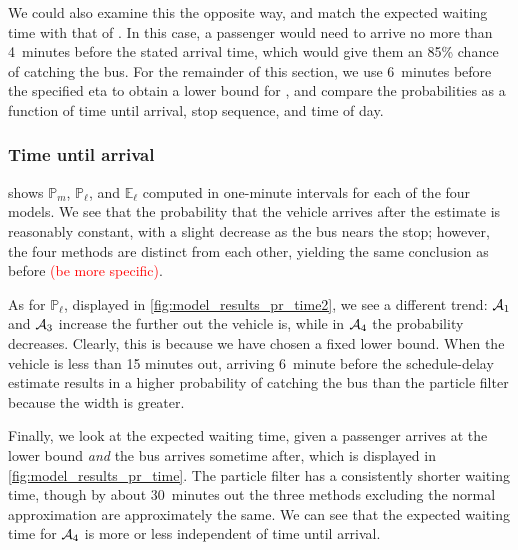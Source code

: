 We could also examine this the opposite way, and match the expected waiting time with that of \Fpf{}. In this case, a passenger would need to arrive no more than 4~minutes before the stated arrival time, which would give them an 85\% chance of catching the bus. For the remainder of this section, we use 6~minutes before the specified \gls{eta} to obtain a lower bound for \Fsched{}, and compare the probabilities as a function of time until arrival, stop sequence, and time of day.



\subsubsection{Time until arrival}

 shows $\mathbb{P}_m$, $\mathbb{P}_\ell$, and $\mathbb{E}_\ell$ computed in one-minute intervals for each of the four models. We see that the probability that the vehicle arrives after the estimate is reasonably constant, with a slight decrease as the bus nears the stop; however, the four methods are distinct from each other, yielding the same conclusion as before \textcolor{red}{(be more specific)}.

As for $\mathbb{P}_\ell$, displayed in \cref{fig:model_results_pr_time2}, we see a different trend: $\mathcal{A}_1$ and $\mathcal{A}_3$ increase the further out the vehicle is, while in $\mathcal{A}_4$ the probability decreases. Clearly, this is because we have chosen a fixed lower bound. When the vehicle is less than 15 minutes out, arriving 6~minute before the schedule-delay estimate results in a higher probability of catching the bus than the particle filter because the width is greater.


Finally, we look at the expected waiting time, given a passenger arrives at the lower bound \emph{and} the bus arrives sometime after, which is displayed in \cref{fig:model_results_pr_time}. The particle filter has a consistently shorter waiting time, though by about 30~minutes out the three methods excluding the normal approximation are approximately the same. We can see that the expected waiting time for $\mathcal{A}_4$ is more or less independent of time until arrival.




